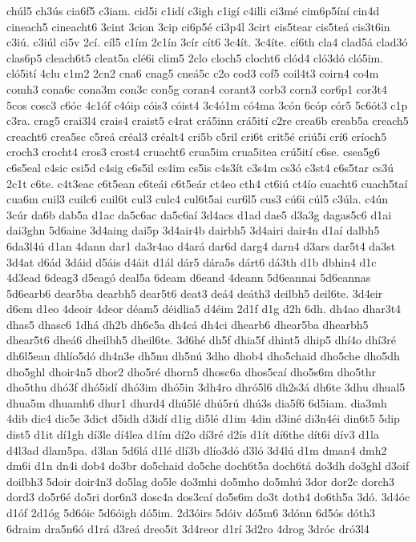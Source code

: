 {chúl5
ch3ús
cia6f5
c3iam.
cid5i
c1idí
c3igh
c1igí
c4illi
ci3mé
cim6p5íní
cin4d
cineach5
cineacht6
3cint
3cion
3cip
ci6p5é
ci3p4l
3cirt
cis5tear
cis5teá
cis3t6in
c3iú.
c3iúl
ci5v
2cí.
cíl5
c1ím
2c1ín
3cír
cít6
3c4ít.
3c4íte.
cí6th
cla4
clad5á
clad3ó
clas6p5
cleach6t5
cleat5a
clé6i
clim5
2clo
cloch5
clocht6
clód4
cló3dó
cló5im.
cló5ití
4clu
c1m2
2cn2
cna6
cnag5
cneá5c
c2o
cod3
cof5
coil4t3
coirn4
co4m
comh3
cona6c
cona3m
con3c
con5g
coran4
corant3
corb3
corn3
cor6p1
cor3t4
5cos
cosc3
c6óc
4c1óf
c4óip
cóis3
cóist4
3c4ó1m
có4ma
3cón
6cóp
cór5
5c6ót3
c1p
c3ra.
crag5
crai3l4
crais4
craist5
c4rat
crá5inn
crá5ití
c2re
crea6b
creab5a
creach5
creacht6
crea5sc
c5reá
créal3
créalt4
cri5b
c5ril
cri6t
crit5é
criú5i
crí6
críoch5
croch3
crocht4
cros3
crost4
cruacht6
crua5im
crua5itea
crú5ití
c6se.
csea5g6
c6s5eal
c4sic
csi5d
c4sig
c6s5il
cs4im
cs5is
c4s3ít
c3s4m
cs3ó
c3st4
c6s5tar
cs3ú
2c1t
c6te.
c4t3eac
c6t5ean
c6teái
c6t5eár
ct4eo
cth4
ct6iú
ct4ío
cuacht6
cuach5taí
cua6m
cuil3
cuilc6
cuil6t
cul3
culc4
cul6t5ai
cur6l5
cus3
cú6i
cúl5
c3úla.
c4ún
3cúr
da6b
dab5a
d1ac
da5c6ac
da5c6aí
3d4acs
d1ad
dae5
d3a3g
dagas5c6
d1ai
dai3ghn
5d6aine
3d4aing
dai5p
3d4air4b
dairbh5
3d4airi
dair4n
d1aí
dalbh5
6da3l4ú
d1an
4dann
dar1
da3r4ao
d4ará
dar6d
darg4
darn4
d3ars
dar5t4
da3st
3d4at
d6ád
3dáid
d5áis
d4áit
d1ál
dár5
dára5s
dárt6
dá3th
d1b
dbhin4
d1c
4d3ead
6deag3
d5eagó
deal5a
6deam
d6eand
4deann
5d6eannai
5d6eannas
5d6earb6
dear5ba
dearbh5
dear5t6
deat3
deá4
deáth3
deilbh5
deil6te.
3d4eir
d6em
d1eo
4deoir
4deor
déam5
déidlia5
d4éim
2d1f
d1g
d2h
6dh.
dh4ao
dhar3t4
dhas5
dhasc6
1dhá
dh2b
dh6c5a
dh4cá
dh4ci
dhearb6
dhear5ba
dhearbh5
dhear5t6
dheá6
dheilbh5
dheil6te.
3d6hé
dh5f
dhia5f
dhint5
dhip5
dhí4o
dhí3ré
dh6l5ean
dhlío5dó
dh4n3e
dh5nu
dh5nú
3dho
dhob4
dho5chaid
dho5che
dho5dh
dho5ghl
dhoir4n5
dhor2
dho5ré
dhorn5
dhosc6a
dhos5caí
dho5s6m
dho5thr
dho5thu
dhó3f
dhó5idí
dhó3im
dhó5in
3dh4ro
dhró5l6
dh2s3á
dh6te
3dhu
dhual5
dhua5m
dhuamh6
dhur1
dhurd4
dhú5lé
dhú5rú
dhú3s
dia5f6
6d5iam.
dia3mh
4dib
dic4
dic5e
3dict
d5idh
d3idí
d1ig
di5lé
d1im
4din
d3iné
di3n4éi
din6t5
5dip
dist5
d1it
dí1gh
dí3le
dí4lea
d1ím
dí2o
dí3ré
d2ís
d1ít
dí6the
dít6i
dív3
d1la
d4l3ad
dlam5pa.
d3lan
5d6lá
d1lé
dlí3b
dlío3dó
d3ló
3d4lú
d1m
dman4
dmh2
dm6i
d1n
dn4i
dob4
do3br
do5chaid
do5che
doch6t5a
doch6tá
do3dh
do3ghl
d3oif
doilbh3
5doir
doir4n3
do5lag
do5le
do3mhi
do5mho
do5mhú
3dor
dor2c
dorch3
dord3
do5r6é
do5ri
dor6n3
dosc4a
dos3caí
do5s6m
do3t
doth4
do6th5a
3dó.
3d4óc
d1óf
2d1óg
5d6óic
5d6óigh
dó5im.
2d3óirs
5dóiv
dó5m6
3dónn
6d5ós
dóth3
6draim
dra5n6ó
d1rá
d3reá
dreo5it
3d4reor
d1rí
3d2ro
4drog
3dróc
dró3l4
}
